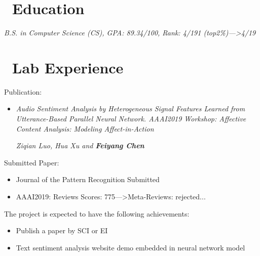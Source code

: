 \documentclass{resume}
\begin{document}



\section{\faGraduationCap\ Education}
\textit{B.S. in Computer Science (CS), GPA: 89.34/100, Rank: 4/191 (top2\%)--->4/19}

\section{\faUsers\ Lab Experience}
Publication:
\begin{itemize}
	\item \textit{Audio Sentiment Analysis by Heterogeneous Signal Features Learned from Utterance-Based Parallel Neural Network. AAAI2019 Workshop: Affective Content Analysis: Modeling Affect-in-Action}
	
	\textit{Ziqian Luo, Hua Xu and \textbf{Feiyang Chen}}
\end{itemize}

Submitted Paper: 
\begin{itemize}
  \item Journal of the Pattern Recognition Submitted
  \item AAAI2019: Reviews Scores: 775--->Meta-Reviews: rejected...
\end{itemize}

The project is expected to have the following achievements: 
\begin{itemize}
	\item Publish a paper by SCI or EI
	\item Text sentiment analysis website demo embedded in neural network model
\end{itemize}
\end{document}
